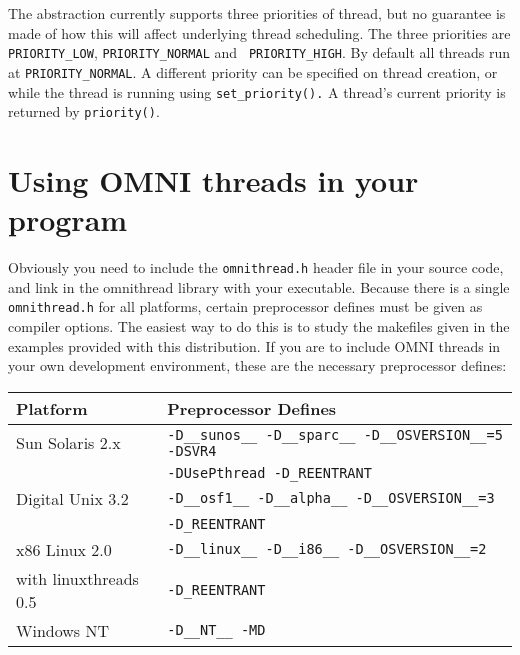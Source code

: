 \documentclass[11pt,twoside,onecolumn]{article}
\begin{document}

The abstraction currently supports three priorities of thread, but no guarantee
is made of how this will affect underlying thread scheduling.  The three
priorities are {\tt PRIORITY\_LOW}, {\tt PRIORITY\_NORMAL} and {\tt
PRIORITY\_HIGH}.  By default all threads run at {\tt PRIORITY\_NORMAL}.  A
different priority can be specified on thread creation, or while the thread is
running using {\tt set\_priority().}  A thread's current priority is returned
by {\tt priority()}.


\section{Using OMNI threads in your program}

Obviously you need to include the {\tt omnithread.h} header file in your source
code, and link in the omnithread library with your executable.  Because there
is a single {\tt omnithread.h} for all platforms, certain preprocessor defines
must be given as compiler options.  The easiest way to do this is to study the
makefiles given in the examples provided with this distribution.  If you are to
include OMNI threads in your own development environment, these are the
necessary preprocessor defines:

\begin{tabular}{|l|l|} \hline
Platform & Preprocessor Defines \\ \hline \hline
Sun Solaris 2.x & \verb|-D__sunos__ -D__sparc__ -D__OSVERSION__=5 -DSVR4| \\
 & \verb|-DUsePthread -D_REENTRANT| \\ \hline
Digital Unix 3.2 & \verb|-D__osf1__ -D__alpha__ -D__OSVERSION__=3| \\
 & \verb|-D_REENTRANT| \\ \hline
x86 Linux 2.0 & \verb|-D__linux__ -D__i86__ -D__OSVERSION__=2| \\
with linuxthreads 0.5 & \verb|-D_REENTRANT| \\ \hline
Windows NT & \verb|-D__NT__ -MD| \\ \hline
\end{tabular}
\end{document}

